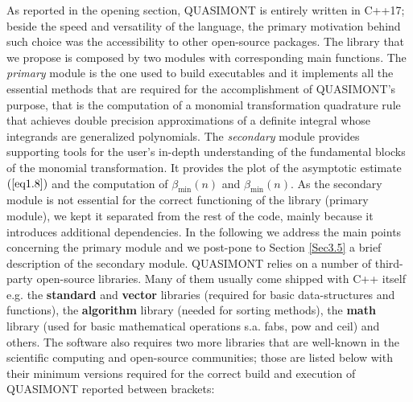 \documentclass[a4paper, twosided]{book}
\begin{document}
\noindent
As reported in the opening section, QUASIMONT is entirely written in C++17; beside the speed and versatility of the language, the primary motivation behind such choice was the accessibility to other open-source packages. The library that we propose is composed by two modules with  corresponding \colorbox{poliGrayBlue}{main} functions. The {\itshape primary} module is the one used  to build executables and it implements all the essential methods that are required for the accomplishment of QUASIMONT's purpose, that is the computation of a monomial transformation quadrature rule that achieves double precision approximations of a definite integral whose integrands are generalized polynomials.  The {\itshape secondary} module provides supporting tools for the user's in-depth understanding of the fundamental blocks of the monomial transformation. It provides the plot of the asymptotic estimate $(\ref{eq1.8})$ and the computation of $\beta_{\text{min}}(n)$ and $\beta_{\text{min}}(n)$. As the secondary module is not essential for the correct functioning of the library (primary module), we kept it separated from the rest of the code, mainly because it introduces additional dependencies. In the following we address the main points concerning the primary module and we post-pone to Section \ref{Sec3.5} a brief description of the secondary module. QUASIMONT relies on a number of third-party open-source libraries. Many of them usually come shipped with C++ itself e.g. the \color{poliDarkBlue} \textbf{standard} \color{black} and \color{poliDarkBlue} \textbf{vector} \color{black} libraries (required for basic data-structures and functions), the \color{poliDarkBlue} \textbf{algorithm} \color{black} library (needed for sorting methods), the \color{poliDarkBlue} \textbf{math} \color{black} library (used for basic mathematical operations s.a. \colorbox{poliGrayBlue}{fabs}, \colorbox{poliGrayBlue}{pow} and \colorbox{poliGrayBlue}{ceil}) and others. The software also requires two more libraries that are well-known in the scientific computing and open-source communities; those are listed below with their minimum versions required for the correct build and execution of QUASIMONT reported between brackets:
\end{document}
